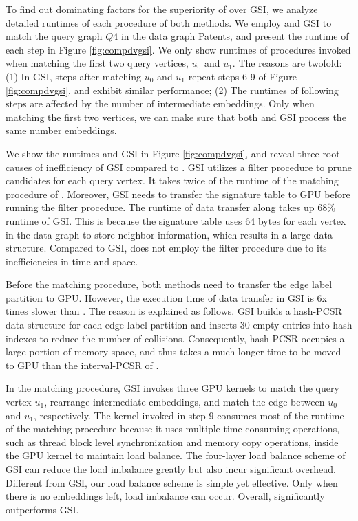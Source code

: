 To find out dominating factors for the superiority of \SystemName over GSI, we analyze detailed runtimes of each procedure of both methods.
We employ \SystemName and GSI to match the query graph $Q4$ in the data graph Patents, and present the runtime of each step in Figure
\ref{fig:compdvgsi}. We only show runtimes of procedures invoked when matching the first two query vertices, $u_0$ and $u_1$. The reasons
are twofold: (1) In GSI, steps after matching $u_0$ and $u_1$ repeat steps 6-9 of Figure \ref{fig:compdvgsi}, and exhibit similar
performance; (2) The runtimes of following steps are affected by the number of intermediate embeddings. Only when matching the first two
vertices, we can make sure that both \SystemName and GSI process the same number embeddings.

We show the runtimes  \SystemName and GSI in Figure \ref{fig:compdvgsi}, and reveal three root causes of inefficiency of GSI compared to
\SystemName. GSI utilizes a filter procedure to prune candidates for each query vertex. It takes twice of the
      runtime of the matching procedure of \SystemName. Moreover, GSI needs to transfer the signature table to GPU before running the
      filter procedure. The runtime of data transfer along takes up 68\% runtime of GSI. This is because the signature table uses 64
      bytes for each vertex in the data graph to store neighbor information, which results in a large data structure. Compared to GSI,
      \SystemName does not employ the filter procedure due to its inefficiencies in time and space.


Before the matching procedure, both methods need to transfer the edge label partition to GPU. However, the execution time of data
      transfer in GSI is 6x times slower than \SystemName. The reason is explained as follows. GSI builds a hash-PCSR data structure for
      each edge label partition and inserts 30 empty entries into hash indexes to reduce the number of collisions. Consequently,
      hash-PCSR occupies a large portion of memory space, and thus takes a much longer time to be moved to GPU than the interval-PCSR of
      \SystemName.

In the matching procedure, GSI invokes three GPU kernels to match the query vertex $u_1$, rearrange intermediate embeddings, and
      match the edge between $u_0$ and $u_1$, respectively. The kernel invoked in step 9 consumes most of the runtime of the matching
      procedure because it uses multiple time-consuming operations, such as thread block level synchronization and memory copy
      operations, inside the GPU kernel to maintain load balance. The four-layer load balance scheme of GSI can reduce the load imbalance
      greatly but also incur significant overhead. Different from GSI, our load balance scheme is simple yet effective. Only when there
      is no embeddings left, load imbalance can occur. Overall, \SystemName significantly outperforms GSI.







